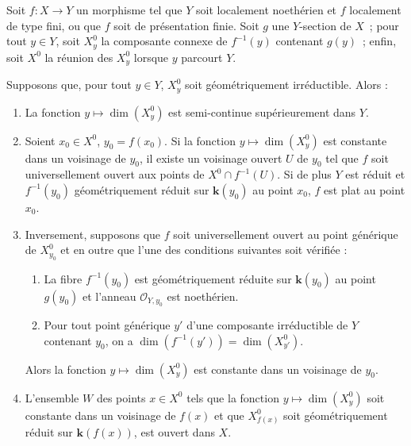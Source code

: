 \begin{proposition}[15.6.6]
Soit $f:X\to Y$ un morphisme tel que $Y$ soit localement noethérien et $f$ localement de type fini, ou que $f$ soit de présentation finie. Soit $g$ une $Y$-section de $X$~; pour tout $y\in Y$, soit $X_y^0$ la composante connexe de $f^{-1}(y)$ contenant $g(y)$~; enfin, soit $X^0$ la réunion des $X_y^0$ lorsque $y$ parcourt $Y$.

Supposons que, pour tout $y\in Y$, $X_y^0$ soit géométriquement irréductible. Alors :
\begin{enumerate}[label=\emph{(\roman*)}]
  \item La fonction $y\mapsto\dim(X_y^0)$ est semi-continue supérieurement dans $Y$.
  \item Soient $x_0\in X^0$, $y_0=f(x_0)$. Si la fonction $y\mapsto\dim(X_y^0)$ est constante dans un voisinage de $y_0$, il existe un voisinage ouvert $U$ de $y_0$ tel que $f$ soit universellement ouvert aux points de $X^0\cap f^{-1}(U)$. Si de plus $Y$ est réduit et $f^{-1}(y_0)$ géométriquement réduit sur $\mathbf{k}(y_0)$ au point $x_0$, $f$ est plat au point $x_0$.
  \item Inversement, supposons que $f$ soit universellement ouvert au point générique de $X_{y_0}^0$ et en outre que l'une des conditions suivantes soit vérifiée :
  \begin{enumerate}
    \item[$\alpha$)] La fibre $f^{-1}(y_0)$ est géométriquement réduite sur $\mathbf{k}(y_0)$ au point $g(y_0)$ et l'anneau $\mathcal O_{Y,y_0}$ est noethérien.
    \item[$\beta$)] Pour tout point générique $y'$ d'une composante irréductible de $Y$ contenant $y_0$, on a $\dim(f^{-1}(y'))=\dim(X_{y'}^0)$.
  \end{enumerate}
  Alors la fonction $y\mapsto\dim(X_y^0)$ est constante dans un voisinage de $y_0$.
  \item L'ensemble $W$ des points $x\in X^0$ tels que la fonction $y\mapsto\dim(X_y^0)$ soit constante dans un voisinage de $f(x)$ et que $X_{f(x)}^0$ soit géométriquement réduit sur $\mathbf{k}(f(x))$, est ouvert dans $X$.
\end{enumerate}
\end{proposition}


